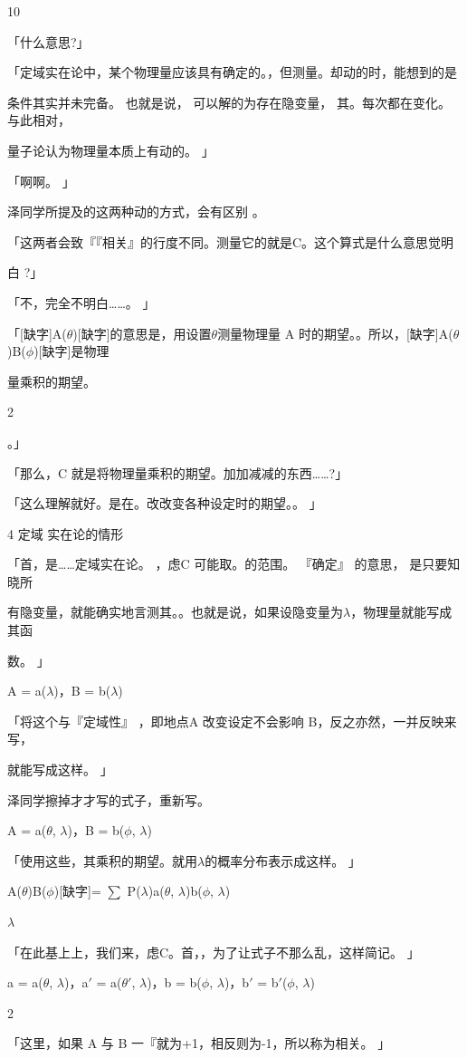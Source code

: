 10\par
「什么意思?」\par
「定域实在论中，某个物理量应该具有确定的。，但测量。却动的时，能想到的是\par
条件其实并未完备。 也就是说， 可以解的为存在隐变量， 其。每次都在变化。 与此相对，\par
量子论认为物理量本质上有动的。 」\par
「啊啊。 」\par
泽同学所提及的这两种动的方式，会有区别 。\par
「这两者会致『『相关』的行度不同。测量它的就是C。这个算式是什么意思觉明\par
白 ?」\par
「不，完全不明白……。 」\par
「[缺字]A($\theta$)[缺字]的意思是，用设置$\theta$测量物理量 A 时的期望。。所以，[缺字]A($\theta$)B($\phi$)[缺字]是物理\par
量乘积的期望。\par
2\par
。」\par
「那么，C 就是将物理量乘积的期望。加加减减的东西……?」\par
「这么理解就好。是在。改改变各种设定时的期望。。 」\par
4 定域 实在论的情形\par
「首，是……定域实在论。 ，虑C 可能取。的范围。 『确定』 的意思， 是只要知晓所\par
有隐变量，就能确实地言测其。。也就是说，如果设隐变量为$\lambda$，物理量就能写成其函\par
数。 」\par
A = a($\lambda$)，B = b($\lambda$)\par
「将这个与『定域性』 ，即地点A 改变设定不会影响 B，反之亦然，一并反映来写，\par
就能写成这样。 」\par
泽同学擦掉才才写的式子，重新写。\par
A = a($\theta$, $\lambda$)，B = b($\phi$, $\lambda$)\par
「使用这些，其乘积的期望。就用$\lambda$的概率分布表示成这样。 」\par
[缺字]A($\theta$)B($\phi$)[缺字]= $\sum$ P($\lambda$)a($\theta$, $\lambda$)b($\phi$, $\lambda$)\par
$\lambda$\par
「在此基上上，我们来，虑C。首，，为了让式子不那么乱，这样简记。 」\par
a = a($\theta$, $\lambda$)，a$\prime$ = a($\theta$$\prime$, $\lambda$)，b = b($\phi$, $\lambda$)，b$\prime$ = b$\prime$($\phi$, $\lambda$)\par
2\par
「这里，如果 A 与 B 一『就为+1，相反则为-1，所以称为相关。 」\par

